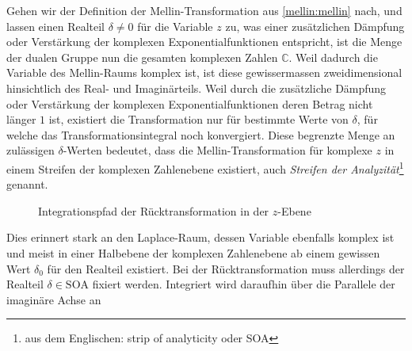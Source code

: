 Gehen wir der Definition der Mellin-Transformation aus 
\eqref{mellin:mellin} nach, und lassen einen Realteil 
$\delta \neq 0$ für die Variable $z$ zu, was einer zusätzlichen 
Dämpfung oder Verstärkung der komplexen Exponentialfunktionen 
entspricht, ist die Menge der dualen Gruppe nun die gesamten 
komplexen Zahlen $\mathbb{C}$.
Weil dadurch die Variable des Mellin-Raums komplex ist, ist diese 
gewissermassen zweidimensional hinsichtlich des Real- und 
Imaginärteils. 
Weil durch die zusätzliche Dämpfung oder Verstärkung der komplexen 
Exponentialfunktionen deren Betrag nicht länger $1$ ist, existiert 
die Transformation nur für bestimmte Werte von $\delta$, für welche 
das Transformationsintegral noch konvergiert.
Diese begrenzte Menge an zulässigen $\delta$-Werten bedeutet, dass 
die Mellin-Transformation für komplexe $z$ in einem Streifen der 
%
komplexen Zahlenebene existiert, auch 
{\em Streifen der Analyzität}\footnote{aus dem Englischen: strip of 
analyticity oder SOA} genannt.
\begin{figure}
    \centering
    \caption{Integrationspfad der Rücktransformation in der $z$-Ebene
    \label{fig:mellin:z}}
\end{figure}
Dies erinnert stark an den Laplace-Raum, dessen Variable ebenfalls 
komplex ist und meist in einer Halbebene der komplexen Zahlenebene 
ab einem gewissen Wert $\delta_0$ für den Realteil existiert.
Bei der Rücktransformation muss allerdings der Realteil 
$\delta \in \text{SOA}$ fixiert werden. 
Integriert wird daraufhin über die Parallele der imaginäre Achse an 

